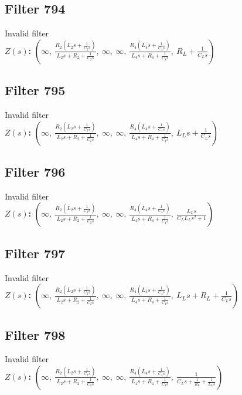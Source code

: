 \documentclass{article}
\begin{document}
\subsection*{Filter 794}
Invalid filter \\ 
\textbf{$Z(s)$:} $\left( \infty, \  \frac{R_{2} \left(L_{2} s + \frac{1}{C_{2} s}\right)}{L_{2} s + R_{2} + \frac{1}{C_{2} s}}, \  \infty, \  \infty, \  \frac{R_{4} \left(L_{4} s + \frac{1}{C_{4} s}\right)}{L_{4} s + R_{4} + \frac{1}{C_{4} s}}, \  R_{L} + \frac{1}{C_{L} s}\right)$ \\ 
\subsection*{Filter 795}
Invalid filter \\ 
\textbf{$Z(s)$:} $\left( \infty, \  \frac{R_{2} \left(L_{2} s + \frac{1}{C_{2} s}\right)}{L_{2} s + R_{2} + \frac{1}{C_{2} s}}, \  \infty, \  \infty, \  \frac{R_{4} \left(L_{4} s + \frac{1}{C_{4} s}\right)}{L_{4} s + R_{4} + \frac{1}{C_{4} s}}, \  L_{L} s + \frac{1}{C_{L} s}\right)$ \\ 
\subsection*{Filter 796}
Invalid filter \\ 
\textbf{$Z(s)$:} $\left( \infty, \  \frac{R_{2} \left(L_{2} s + \frac{1}{C_{2} s}\right)}{L_{2} s + R_{2} + \frac{1}{C_{2} s}}, \  \infty, \  \infty, \  \frac{R_{4} \left(L_{4} s + \frac{1}{C_{4} s}\right)}{L_{4} s + R_{4} + \frac{1}{C_{4} s}}, \  \frac{L_{L} s}{C_{L} L_{L} s^{2} + 1}\right)$ \\ 
\subsection*{Filter 797}
Invalid filter \\ 
\textbf{$Z(s)$:} $\left( \infty, \  \frac{R_{2} \left(L_{2} s + \frac{1}{C_{2} s}\right)}{L_{2} s + R_{2} + \frac{1}{C_{2} s}}, \  \infty, \  \infty, \  \frac{R_{4} \left(L_{4} s + \frac{1}{C_{4} s}\right)}{L_{4} s + R_{4} + \frac{1}{C_{4} s}}, \  L_{L} s + R_{L} + \frac{1}{C_{L} s}\right)$ \\ 
\subsection*{Filter 798}
Invalid filter \\ 
\textbf{$Z(s)$:} $\left( \infty, \  \frac{R_{2} \left(L_{2} s + \frac{1}{C_{2} s}\right)}{L_{2} s + R_{2} + \frac{1}{C_{2} s}}, \  \infty, \  \infty, \  \frac{R_{4} \left(L_{4} s + \frac{1}{C_{4} s}\right)}{L_{4} s + R_{4} + \frac{1}{C_{4} s}}, \  \frac{1}{C_{L} s + \frac{1}{R_{L}} + \frac{1}{L_{L} s}}\right)$ \\ 
\end{document}
